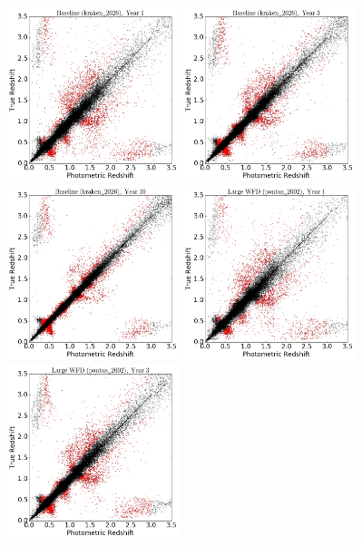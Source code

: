 \begin{figure}
\begin{center}
\includegraphics[width=5cm,trim={0cm 0cm 0cm 0cm},clip]{figures/tzpz_kraken2026_1.png}
\includegraphics[width=5cm,trim={0cm 0cm 0cm 0cm},clip]{figures/tzpz_kraken2026_3.png}
\includegraphics[width=5cm,trim={0cm 0cm 0cm 0cm},clip]{figures/tzpz_kraken2026_10.png}
\includegraphics[width=5cm,trim={0cm 0cm 0cm 0cm},clip]{figures/tzpz_pontus2002_1.png}
\includegraphics[width=5cm,trim={0cm 0cm 0cm 0cm},clip]{figures/tzpz_pontus2002_3.png}

\end{center}
\end{figure}
